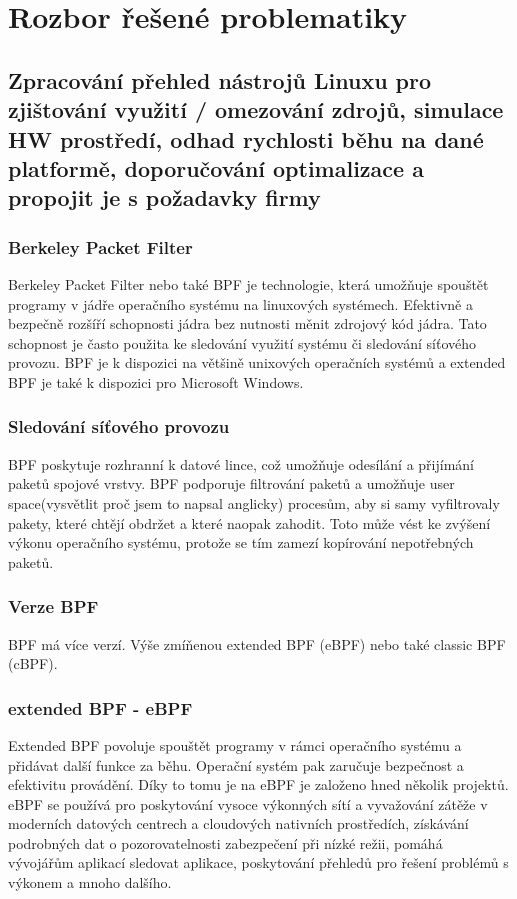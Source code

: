 \chapter{Rozbor řešené problematiky}

\section{Zpracování přehled nástrojů Linuxu pro zjištování využití / omezování zdrojů, simulace HW prostředí, odhad rychlosti běhu na dané platformě, doporučování optimalizace a propojit je s požadavky firmy}

\subsection{Berkeley Packet Filter}

Berkeley Packet Filter nebo také BPF je technologie, která umožňuje spouštět programy v jádře operačního systému na linuxových systémech.
Efektivně a bezpečně rozšíří schopnosti jádra bez nutnosti měnit zdrojový kód jádra. Tato schopnost je často použita ke sledování využití systému či sledování síťového provozu.
BPF je k dispozici na většině unixových operačních systémů a extended BPF je také k dispozici pro Microsoft Windows.

\subsection*{Sledování síťového provozu}
BPF poskytuje rozhranní k datové lince, což umožňuje odesílání a přijímání paketů spojové vrstvy. BPF podporuje filtrování paketů a umožňuje user space(vysvětlit proč jsem to napsal anglicky) procesům,
aby si samy vyfiltrovaly pakety, které chtějí obdržet a které naopak zahodit. Toto může vést ke zvýšení výkonu operačního systému, protože se tím zamezí kopírování nepotřebných paketů.

\subsection*{Verze BPF}
BPF má více verzí. Výše zmíňenou extended BPF (eBPF) nebo také classic BPF (cBPF).

\subsection*{extended BPF - eBPF}
Extended BPF povoluje spouštět programy v rámci operačního systému a přidávat další funkce za běhu.
Operační systém pak zaručuje bezpečnost a efektivitu provádění. Díky to tomu je na eBPF je založeno hned několik projektů.
eBPF se používá pro  poskytování vysoce výkonných sítí a vyvažování zátěže v moderních datových centrech a cloudových nativních prostředích,
získávání podrobných dat o pozorovatelnosti zabezpečení při nízké režii, pomáhá vývojářům aplikací sledovat aplikace,
poskytování přehledů pro řešení problémů s výkonem a mnoho dalšího.

